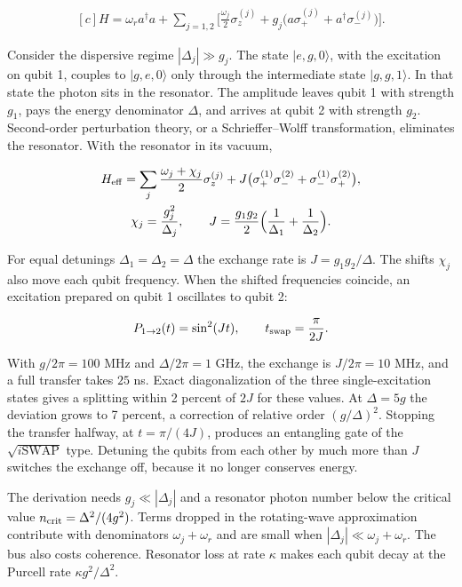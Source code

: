 \documentclass[11pt,oneside]{book}
\newenvironment{centeredalign}{\[\begin{gathered}[c]}{\end{gathered}\]}
\begin{document}
\begin{centeredalign}
H=\omega_ra^\dagger a+\sum_{j=1,2}\Big[\frac{\omega_j}{2}\sigma_z^{(j)}
+g_j\big(a\sigma_+^{(j)}+a^\dagger\sigma_-^{(j)}\big)\Big].
\end{centeredalign}

Consider the dispersive regime \(|\Delta_j|\gg g_j\). The state \(|e,g,0\rangle\), with the excitation on qubit 1, couples to \(|g,e,0\rangle\) only through the intermediate state \(|g,g,1\rangle\). In that state the photon sits in the resonator. The amplitude leaves qubit 1 with strength \(g_1\), pays the energy denominator \(\Delta\), and arrives at qubit 2 with strength \(g_2\). Second-order perturbation theory, or a Schrieffer--Wolff transformation, eliminates the resonator. With the resonator in its vacuum,

\begin{centeredalign}
H_{\rm eff}=\sum_j\frac{\omega_j+\chi_j}{2}\sigma_z^{(j)}
+J\big(\sigma_+^{(1)}\sigma_-^{(2)}+\sigma_-^{(1)}\sigma_+^{(2)}\big),\\
\chi_j=\frac{g_j^2}{\Delta_j},\qquad J=\frac{g_1g_2}{2}\Big(\frac{1}{\Delta_1}+\frac{1}{\Delta_2}\Big).
\end{centeredalign}

For equal detunings \(\Delta_1=\Delta_2=\Delta\) the exchange rate is \(J=g_1g_2/\Delta\). The shifts \(\chi_j\) also move each qubit frequency. When the shifted frequencies coincide, an excitation prepared on qubit 1 oscillates to qubit 2:

\begin{centeredalign}
P_{1\to2}(t)=\sin^2(Jt),\qquad t_{\rm swap}=\frac{\pi}{2J}.
\end{centeredalign}

With \(g/2\pi=100\) MHz and \(\Delta/2\pi=1\) GHz, the exchange is \(J/2\pi=10\) MHz, and a full transfer takes \(25\) ns. Exact diagonalization of the three single-excitation states gives a splitting within 2 percent of \(2J\) for these values. At \(\Delta=5g\) the deviation grows to 7 percent, a correction of relative order \((g/\Delta)^2\). Stopping the transfer halfway, at \(t=\pi/(4J)\), produces an entangling gate of the \(\sqrt{i\mathrm{SWAP}}\) type. Detuning the qubits from each other by much more than \(J\) switches the exchange off, because it no longer conserves energy.

The derivation needs \(g_j\ll|\Delta_j|\) and a resonator photon number below the critical value \(n_{\rm crit}=\Delta^2/(4g^2)\). Terms dropped in the rotating-wave approximation contribute with denominators \(\omega_j+\omega_r\) and are small when \(|\Delta_j|\ll\omega_j+\omega_r\). The bus also costs coherence. Resonator loss at rate \(\kappa\) makes each qubit decay at the Purcell rate \(\kappa g^2/\Delta^2\).
\end{document}
